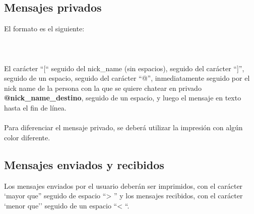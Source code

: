 \documentclass{article}
\begin{document}
\subsection{Mensajes privados}
\noindent El formato es el siguiente:
\\~\\
\\~\\
El	carácter “[“ seguido	del	nick\_name	(sin	espacios),	seguido	del	carácter “]”,	seguido	de	
un	espacio,	seguido	del	carácter “@”,	inmediatamente	seguido	por	el	nick name	de	la	persona	
con	la	que	se	quiere	chatear	en	privado {\selectfont\textbf{@nick\_name\_destino}}, seguido	de	un	espacio,	y	
luego	el	mensaje	en	texto	hasta	el	fin	de	línea.
\\~\\
Para	diferenciar	el	mensaje	privado,	se	deberá	utilizar	la	impresión	con	algún	color	diferente.	

\subsection{Mensajes enviados y recibidos}
\noindent Los	mensajes	enviados	por	el	usuario	deberán	ser	imprimidos,	con	el	carácter ‘mayor que”
seguido	de	espacio “> ” y	los	mensajes	recibidos,	con	el	carácter ‘menor	que’’ seguido	de	un	
espacio “<	“.
\end{document}
